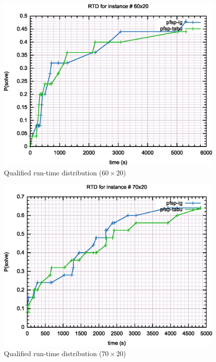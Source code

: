 \begin{figure}[H]
	\centering
	\includegraphics[width=\textwidth]{fig/qrd/60x20}
	\caption{Qualified run-time distribution ($60 \times 20$)}
\end{figure}

\begin{figure}[H]
	\centering
	\includegraphics[width=\textwidth]{fig/qrd/70x20}
	\caption{Qualified run-time distribution ($70 \times 20$)}
\end{figure}

